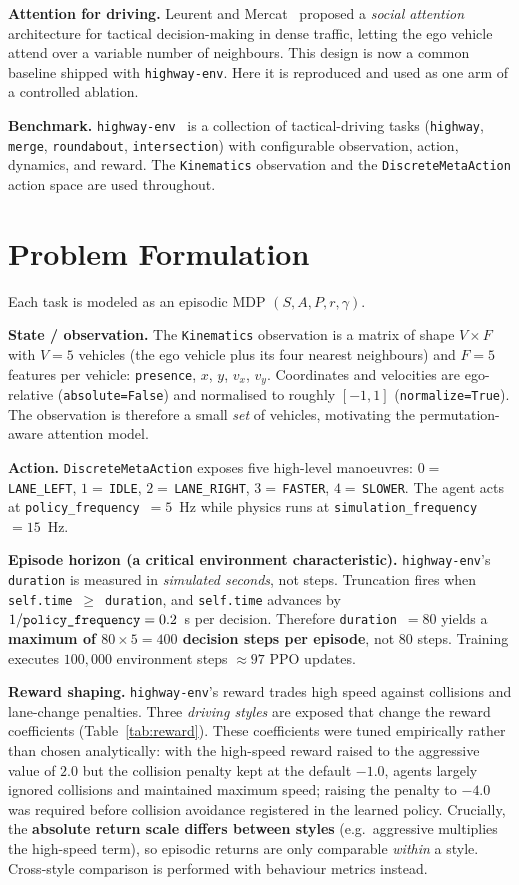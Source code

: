 \documentclass[conference]{IEEEtran}
\newcommand{\code}[1]{\texttt{#1}}
\begin{document}
\textbf{Attention for driving.} Leurent and Mercat~\cite{leurent2019social}
proposed a \emph{social attention} architecture for tactical decision-making in
dense traffic, letting the ego vehicle attend over a variable number of
neighbours. This design is now a common baseline shipped with \code{highway-env}.
Here it is reproduced and used as one arm of a controlled ablation.

\textbf{Benchmark.} \code{highway-env}~\cite{leurent2018environment} is a
collection of tactical-driving tasks (\code{highway}, \code{merge},
\code{roundabout}, \code{intersection}) with configurable observation, action,
dynamics, and reward. The \code{Kinematics} observation and the
\code{DiscreteMetaAction} action space are used throughout.

\section{Problem Formulation}
Each task is modeled as an episodic MDP $(S, A, P, r, \gamma)$.

\textbf{State / observation.} The \code{Kinematics} observation is a matrix of
shape $V \times F$ with $V = 5$ vehicles (the ego vehicle plus its four nearest
neighbours) and $F = 5$ features per vehicle:
\code{presence}, $x$, $y$, $v_x$, $v_y$. Coordinates and velocities are
ego-relative (\code{absolute=False}) and normalised to roughly $[-1, 1]$
(\code{normalize=True}). The observation is therefore a small \emph{set} of
vehicles, motivating the permutation-aware attention model.

\textbf{Action.} \code{DiscreteMetaAction} exposes five high-level manoeuvres:
$0=$\,\code{LANE\_LEFT}, $1=$\,\code{IDLE}, $2=$\,\code{LANE\_RIGHT},
$3=$\,\code{FASTER}, $4=$\,\code{SLOWER}. The agent acts at
\code{policy\_frequency}~$=5$~Hz while physics runs at
\code{simulation\_frequency}~$=15$~Hz.

\textbf{Episode horizon (a critical environment characteristic).}
\code{highway-env}'s \code{duration} is measured in \emph{simulated seconds},
not steps. Truncation fires when \code{self.time}~$\geq$~\code{duration}, and
\code{self.time} advances by $1/\text{\code{policy\_frequency}} = 0.2$~s per
decision. Therefore \code{duration}~$=80$ yields a \textbf{maximum of
$80 \times 5 = 400$ decision steps per episode}, not 80 steps. Training executes
$100{,}000$ environment steps $\approx 97$ PPO updates.

\textbf{Reward shaping.} \code{highway-env}'s reward trades high speed against
collisions and lane-change penalties. Three \emph{driving styles} are exposed
that change the reward coefficients (Table~\ref{tab:reward}). These coefficients
were tuned empirically rather than chosen analytically: with the high-speed
reward raised to the aggressive value of $2.0$ but the collision penalty kept at
the default $-1.0$, agents largely ignored collisions and maintained maximum
speed; raising the penalty to $-4.0$ was required before collision avoidance
registered in the learned policy.
Crucially, the \textbf{absolute return scale differs
between styles} (e.g.\ aggressive multiplies the high-speed term), so episodic
returns are only comparable \emph{within} a style. Cross-style comparison is
performed with behaviour metrics instead.
\end{document}
